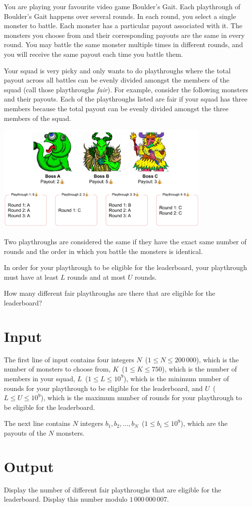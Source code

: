 
You are playing your favourite video game Boulder's Gait. Each playthrough of Boulder's Gait happens over several rounds. In each round, you select a single monster to battle. Each monster has a particular payout associated with it. The monsters you choose from and their corresponding payouts are the same in every round. You may battle the same monster multiple times in different rounds, and you will receive the same payout each time you battle them.

Your squad is very picky and only wants to do playthroughs where the total payout across all battles can be evenly divided amongst the members of the squad (call those playthroughs \textit{fair}). For example, consider the following monsters and their payouts. Each of the playthroughs listed are fair if your squad has three members because the total payout can be evenly divided amongst the three members of the squad.

\begin{center}
 \includegraphics[width=0.8\textwidth]{LootingLuxury}
\end{center}

Two playthroughs are considered the same if they have the exact same number of rounds and the order in which you battle the monsters is identical.

In order for your playthrough to be eligible for the leaderboard, your playthrough must have at least $L$ rounds and at most $U$ rounds.

How many different fair playthroughs are there that are eligible for the leaderboard?


\section*{Input}

The first line of input contains four integers $N$~($1 \leq N \leq 200\,000$), which is the number of monsters to choose from, $K$~($1 \leq K \leq 750$), which is the number of members in your squad, $L$~($1 \leq L \leq 10^9$), which is the minimum number of rounds for your playthrough to be eligible for the leaderboard, and $U$~($L \leq U \leq 10^9$), which is the maximum number of rounds for your playthrough to be eligible for the leaderboard.

The next line contains $N$ integers $b_1, b_2, \dots, b_N$~($1 \leq b_i \leq 10^9$), which are the payouts of the $N$ monsters.


\section*{Output}

Display the number of different fair playthroughs that are eligible for the leaderboard. Display this number modulo $1\,000\,000\,007$.
